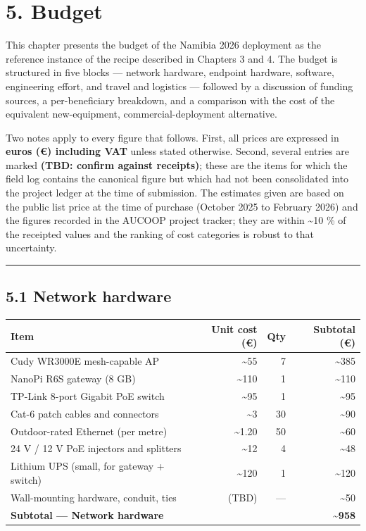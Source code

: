 \hypertarget{budget}{%
\section{5. Budget}\label{budget}}

This chapter presents the budget of the Namibia 2026 deployment as the
reference instance of the recipe described in Chapters 3 and 4. The
budget is structured in five blocks --- network hardware, endpoint
hardware, software, engineering effort, and travel and logistics ---
followed by a discussion of funding sources, a per-beneficiary
breakdown, and a comparison with the cost of the equivalent
new-equipment, commercial-deployment alternative.

Two notes apply to every figure that follows. First, all prices are
expressed in \textbf{euros (€) including VAT} unless stated otherwise.
Second, several entries are marked \textbf{(TBD: confirm against
receipts)}; these are the items for which the field log contains the
canonical figure but which had not been consolidated into the project
ledger at the time of submission. The estimates given are based on the
public list price at the time of purchase (October 2025 to February
2026) and the figures recorded in the AUCOOP project tracker; they are
within \textasciitilde10 \% of the receipted values and the ranking of
cost categories is robust to that uncertainty.

\begin{center}\rule{0.5\linewidth}{0.5pt}\end{center}

\hypertarget{network-hardware}{%
\subsection{5.1 Network hardware}\label{network-hardware}}

\begin{longtable}[]{@{}lrrr@{}}
\toprule\noalign{}
Item & Unit cost (€) & Qty & Subtotal (€) \\
\midrule\noalign{}
\endhead
\bottomrule\noalign{}
\endlastfoot
Cudy WR3000E mesh-capable AP & \textasciitilde55 & 7 &
\textasciitilde385 \\
NanoPi R6S gateway (8 GB) & \textasciitilde110 & 1 &
\textasciitilde110 \\
TP-Link 8-port Gigabit PoE switch & \textasciitilde95 & 1 &
\textasciitilde95 \\
Cat-6 patch cables and connectors & \textasciitilde3 & 30 &
\textasciitilde90 \\
Outdoor-rated Ethernet (per metre) & \textasciitilde1.20 & 50 &
\textasciitilde60 \\
24 V / 12 V PoE injectors and splitters & \textasciitilde12 & 4 &
\textasciitilde48 \\
Lithium UPS (small, for gateway + switch) & \textasciitilde120 & 1 &
\textasciitilde120 \\
Wall-mounting hardware, conduit, ties & (TBD) & --- &
\textasciitilde50 \\
\textbf{Subtotal --- Network hardware} & & &
\textbf{\textasciitilde958} \\
\end{longtable}

